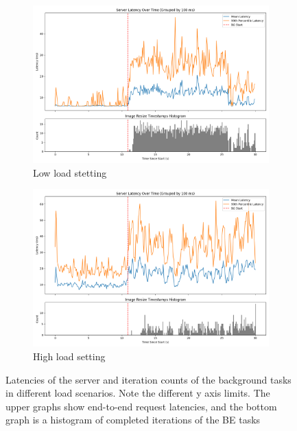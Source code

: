\begin{figure}[t]
    \centering
    \begin{subfigure}[b]{0.49\columnwidth}
        \includegraphics[width=\columnwidth]{graphs/unedited-weight-low-two.png}
        \caption{Low load stetting}\label{fig:unedited-weight-low-two}
    \end{subfigure}
    \hspace{\fill}
    \begin{subfigure}[b]{0.49\columnwidth}
        \includegraphics[width=\columnwidth]{graphs/unedited-weight-high-two.png}
        \caption{High load setting}\label{fig:unedited-weight-high-two}
    \end{subfigure}
    \vspace{4pt}
    \caption{Latencies of the server and iteration counts of the background
    tasks in different load scenarios. Note the different y axis limits. The
    upper graphs show end-to-end request latencies, and the bottom graph is a
    histogram of completed iterations of the BE tasks}\label{fig:unedited-weight}
\end{figure}

